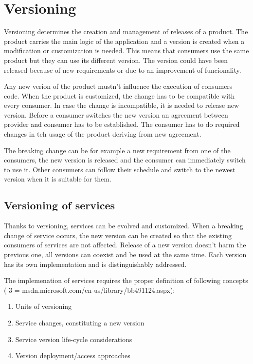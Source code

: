 \chapter{Versioning}
\label{chap:versioning}

Versioning determines the creation and management of releases of a product. The product carries the main logic of the application and a version is created when a modification or customization is needed. This means that consumers use the same product but they can use its different version. The version could have been released because of new requirements or due to an improvement of funcionality. 

Any new verion of the product mustn't influence the execution of consumers code. When the product is customized, the change has to be compatible with every consumer. In case the change is incompatible, it is needed to release new version. Before a consumer switches the new version an agreement between provider and consumer has to be established. The consumer has to do required changes in teh usage of the product deriving from new agreement.

The breaking change can be for example a new requirement from one of the consumers, the new version is released and the consumer can immediately switch to use it. Other consumers can follow their schedule and switch to the newest version when it is suitable for them. 

\section{Versioning of services}
\label{sec:verioningservices}
Thanks to versioning, services can be evolved and customized. When a breaking change of service occurs, the new version can be created so that the existing consumers of services are not affected. Release of a new version doesn't harm the previous one, all versions can coexist and be used at the same time. Each version has its own implementation and is distinguishably addressed.

\bigskip 

The implemenation of services requires the proper definition of following concepts ( 3 = msdn.microsoft.com/en-us/library/bb491124.aspx):
\begin{enumerate}
  \item Units of versioning
  \item Service changes, constituting a new version
  \item Service version life-cycle considerations
  \item Version deployment/access approaches
\end{enumerate}

